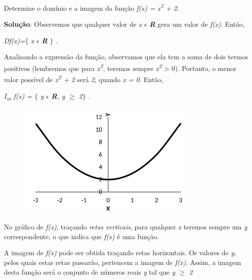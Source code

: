 \begin{texemplo}
Determine o domínio e a imagem da função \textit{ f(x) = x\textsuperscript{2} + 2.}

\textbf{Solução}:  Observemos que qualquer valor de \textit{x $ \epsilon $   \textbf{R}} gera um valor de \textit{f(x)}. Então, 

\tab  \textit{Df(x)=$ \{ $ x $ \epsilon $   \textbf{R}} \textit{$ \} $ .}

Analisando a expressão da função, observamos que ela tem a soma de dois termos positivos (lembremos que para \textit{x\textsuperscript{2}}, teremos sempre \textit{x\textsuperscript{2}} > 0). Portanto, o menor valor possível de \textit{x\textsuperscript{2} + 2 } será \textit{2}, quando \textit{x = 0}. Então, 

\textit{I\textsubscript{m} f(x) = $ \{ $  y $ \epsilon $   \textbf{R}, y $ \geq $  2$ \} $ .}

\begin{figure}[H]
	\begin{Center}
		\includegraphics[width=3.5in,height=2.24in]{capitulos/funcao_do_primeiro_grau/media/image8.pdf}
	\end{Center}
\end{figure}

No gráfico de \textit{f(x)}, traçando \textit{retas verticais}, para qualquer \textit{x} teremos sempre um \textit{y} correspondente, o que indica que \textit{f(x)} é uma função.  

A imagem de \textit{f(x)} pode ser obtida traçando retas horizontais. Os valores de \textit{y}, pelos quais estas retas passarão, pertencem a imagem de \textit{f(x)}. Assim, a imagem desta função será o conjunto de números reais \textit{y }tal que  \textit{y $ \geq $  2 }\qedsymbol{}
\end{texemplo}

